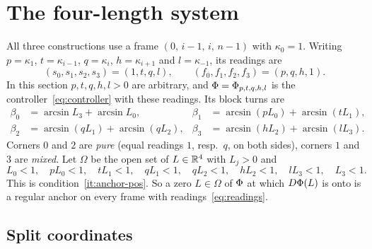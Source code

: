 \section{The four-length system}\label{sec:system}

All three constructions use a frame $(0,\,i-1,\,i,\,n-1)$ with $\kappa_0=1$.
Writing $p=\kappa_1$, $t=\kappa_{i-1}$, $q=\kappa_i$, $h=\kappa_{i+1}$ and
$l=\kappa_{-1}$, its readings are
\begin{equation}\label{eq:readings}
  (s_0,s_1,s_2,s_3)=(1,t,q,l),\qquad (f_0,f_1,f_2,f_3)=(p,q,h,1).
\end{equation}
In this section $p,t,q,h,l>0$ are arbitrary, and $\Phi=\Phi_{p,t,q,h,l}$ is
the controller~\eqref{eq:controller} with these readings. Its block turns are
\begin{align*}
  \beta_0&=\arcsin L_3+\arcsin L_0, & \beta_1&=\arcsin(pL_0)+\arcsin(tL_1),\\
  \beta_2&=\arcsin(qL_1)+\arcsin(qL_2), & \beta_3&=\arcsin(hL_2)+\arcsin(lL_3).
\end{align*}
Corners $0$ and $2$ are \emph{pure} (equal readings $1$, resp.\ $q$, on both
sides), corners $1$ and $3$ are \emph{mixed}. Let $\Omega$ be the open set of
$L\in\mathbb{R}^4$ with $L_j>0$ and
\begin{equation}\label{eq:walls}
  L_0<1,\quad pL_0<1,\quad tL_1<1,\quad qL_1<1,\quad qL_2<1,\quad hL_2<1,
  \quad lL_3<1,\quad L_3<1 .
\end{equation}
This is condition~\ref{it:anchor-pos}. So a zero $L\in\Omega$ of $\Phi$ at
which $D\Phi(L)$ is onto is a regular anchor on every frame with
readings~\eqref{eq:readings}.

\subsection{Split coordinates}

